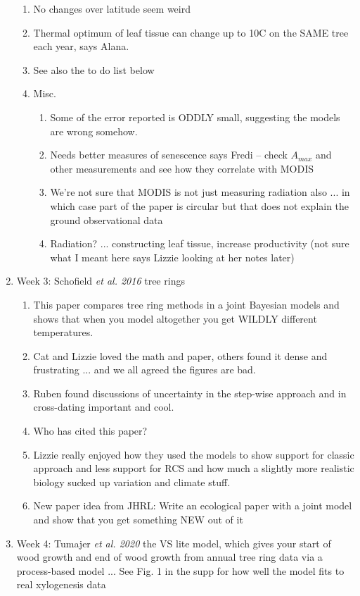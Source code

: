 \documentclass[11pt,letter]{article}
\begin{document}
\begin{enumerate}
\begin{enumerate}
\item No changes over latitude seem weird 
\item Thermal optimum of leaf tissue can change up to 10C on the SAME tree each year, says Alana. 
\item See also the to do list below
\item Misc.
\begin{enumerate}
\item Some of the error reported is ODDLY small, suggesting the models are wrong somehow.
\item Needs better measures of senescence says Fredi -- check $A_{max}$ and other measurements and see how they correlate with MODIS
\item We're not sure that MODIS is not just measuring radiation also ... in which case part of the paper is circular but that does not explain the ground observational data
\item Radiation? ... constructing leaf tissue, increase productivity (not sure what I meant here says Lizzie looking at her notes later)
\end{enumerate}
\end{enumerate}
\item Week 3: Schofield \emph{et al. 2016} tree rings
\begin{enumerate}
\item This paper compares tree ring methods in a joint Bayesian models and shows that when you model altogether you get WILDLY different temperatures. 
\item Cat and Lizzie loved the math and paper, others found it dense and frustrating ... and we all agreed the figures are bad.
\item Ruben found discussions of uncertainty in the step-wise approach and in cross-dating important and cool.
\item Who has cited this paper?
\item Lizzie really enjoyed how they used the models to show support for classic approach and less support for RCS and how much a slightly more realistic biology sucked up variation and climate stuff. 
\item New paper idea from JHRL: Write an ecological paper with a joint model and show that you get something NEW out of it 
\end{enumerate}
\item Week 4:  Tumajer \emph{et al. 2020} the VS lite model, which gives your start of wood growth and end of wood growth from annual tree ring data via a process-based model ... See Fig. 1 in the supp for how well the model fits to real xylogenesis data

\end{enumerate}
\end{document}
